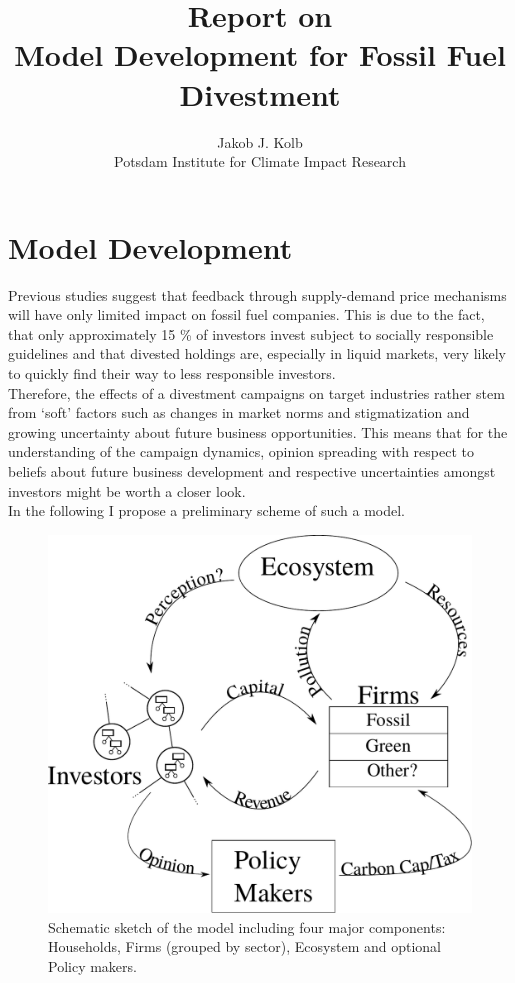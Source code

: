 \title{Report on \\ Model Development for Fossil Fuel Divestment}
\author{Jakob J. Kolb \\ Potsdam Institute for Climate Impact Research}

\maketitle

\section{Model Development}

Previous studies \cite{Ans2013} suggest that feedback through supply-demand price mechanisms will have only limited impact on fossil fuel companies. This is due to the fact, that only approximately 15 \% of investors invest subject to socially responsible guidelines \cite{SIF2014Report} and that divested holdings are, especially in liquid markets, very likely to quickly find their way to less responsible investors. \\
Therefore, the effects of a divestment campaigns on target industries rather stem from `soft' factors such as changes in market norms and stigmatization and growing uncertainty about future business opportunities. This means that for the understanding of the campaign dynamics, opinion spreading with respect to beliefs about future business development and respective uncertainties amongst investors might be worth a closer look. \\
In the following I propose a preliminary scheme of such a model.

\begin{figure}[h]
	\centering
	\includegraphics[width = .7 \textwidth]{figures/Model_Scheme.pdf}
	\caption{Schematic sketch of the model including four major components: Households, Firms (grouped by sector), Ecosystem and optional Policy makers.}
	\label{fig:model}
\end{figure}

